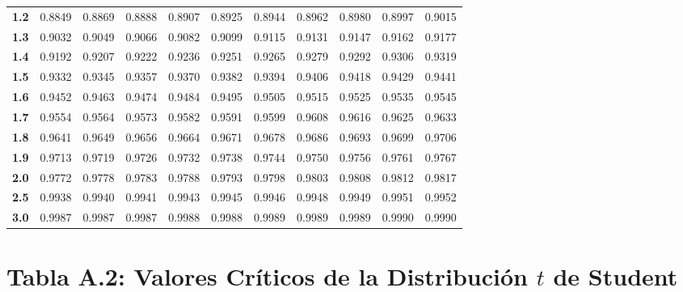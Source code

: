 \begin{center}
\begin{tabular}{c|cccccccccc}
\textbf{1.2} & 0.8849 & 0.8869 & 0.8888 & 0.8907 & 0.8925 & 0.8944 & 0.8962 & 0.8980 & 0.8997 & 0.9015 \\
\textbf{1.3} & 0.9032 & 0.9049 & 0.9066 & 0.9082 & 0.9099 & 0.9115 & 0.9131 & 0.9147 & 0.9162 & 0.9177 \\
\textbf{1.4} & 0.9192 & 0.9207 & 0.9222 & 0.9236 & 0.9251 & 0.9265 & 0.9279 & 0.9292 & 0.9306 & 0.9319 \\
\textbf{1.5} & 0.9332 & 0.9345 & 0.9357 & 0.9370 & 0.9382 & 0.9394 & 0.9406 & 0.9418 & 0.9429 & 0.9441 \\
\textbf{1.6} & 0.9452 & 0.9463 & 0.9474 & 0.9484 & 0.9495 & 0.9505 & 0.9515 & 0.9525 & 0.9535 & 0.9545 \\
\textbf{1.7} & 0.9554 & 0.9564 & 0.9573 & 0.9582 & 0.9591 & 0.9599 & 0.9608 & 0.9616 & 0.9625 & 0.9633 \\
\textbf{1.8} & 0.9641 & 0.9649 & 0.9656 & 0.9664 & 0.9671 & 0.9678 & 0.9686 & 0.9693 & 0.9699 & 0.9706 \\
\textbf{1.9} & 0.9713 & 0.9719 & 0.9726 & 0.9732 & 0.9738 & 0.9744 & 0.9750 & 0.9756 & 0.9761 & 0.9767 \\
\textbf{2.0} & 0.9772 & 0.9778 & 0.9783 & 0.9788 & 0.9793 & 0.9798 & 0.9803 & 0.9808 & 0.9812 & 0.9817 \\
\textbf{2.5} & 0.9938 & 0.9940 & 0.9941 & 0.9943 & 0.9945 & 0.9946 & 0.9948 & 0.9949 & 0.9951 & 0.9952 \\
\textbf{3.0} & 0.9987 & 0.9987 & 0.9987 & 0.9988 & 0.9988 & 0.9989 & 0.9989 & 0.9989 & 0.9990 & 0.9990 \\
\bottomrule
\end{tabular}
\end{center}

\vspace{0.8cm}

\section*{Tabla A.2: Valores Críticos de la Distribución $t$ de Student}

